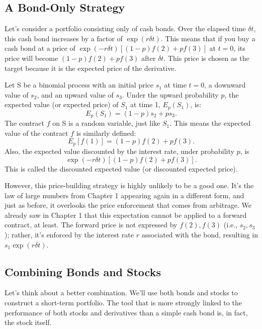 \documentclass[uplatex,a4j,12pt,dvipdfmx]{jsarticle}
\begin{document}
\subsection{A Bond-Only Strategy}
Let's consider a portfolio consisting only of cash bonds. Over the elapsed time $\delta t$, this cash bond increases by a factor of $\exp(r\delta t)$. This means that if you buy a cash bond at a price of $\exp(-r\delta t)[(1-p)f(2) + pf(3)]$ at $t=0$, its price will become $(1-p)f(2) + pf(3)$ after $\delta t$. This price is chosen as the target because it is the expected price of the derivative.

Let S be a binomial process with an initial price $s_1$ at time $t=0$, a downward value of $s_2$, and an upward value of $s_3$. Under the upward probability $p$, the expected value (or expected price) of $S_1$ at time 1, $E_p(S_1)$, is:
\[E_p(S_1) = (1-p)s_2 + ps_3.\]
The contract $f$ on S is a random variable, just like $S_1$. This means the expected value of the contract $f$ is similarly defined:
\[E_p[f(1)] = (1-p)f(2) + pf(3).\]
Also, the expected value discounted by the interest rate, under probability $p$, is \[\exp(-r\delta t)[(1-p)f(2) + pf(3)].\] This is called the discounted expected value (or discounted expected price).

However, this price-building strategy is highly unlikely to be a good one. It's the law of large numbers from Chapter 1 appearing again in a different form, and just as before, it overlooks the price enforcement that comes from arbitrage. We already saw in Chapter 1 that this expectation cannot be applied to a forward contract, at least. The forward price is not expressed by $f(2), f(3)$ (i.e., $s_2, s_3$); rather, it's enforced by the interest rate $r$ associated with the bond, resulting in $s_1 \exp(r\delta t)$.

\subsection{Combining Bonds and Stocks}
Let's think about a better combination. We'll use both bonds and stocks to construct a short-term portfolio. The tool that is more strongly linked to the performance of both stocks and derivatives than a simple cash bond is, in fact, the stock itself.
\end{document}
